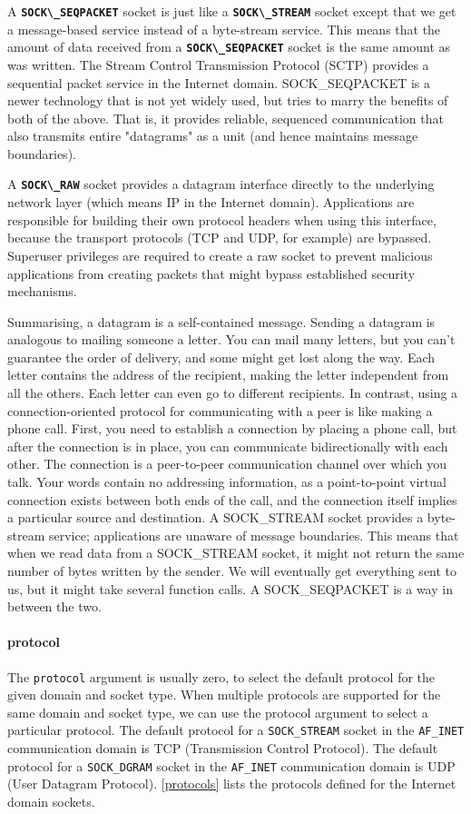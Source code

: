 \documentclass[12pt, letterpaper]{article}
\theoremstyle{definition}
\let\tb\textbf
\let\cd\lstinline
\begin{document}
A \tb{\cd+SOCK\_SEQPACKET+} socket is just like a \tb{\cd+SOCK\_STREAM+} socket except that we get a message-based service instead of a byte-stream service. This means that the amount of data received from a \tb{\cd+SOCK\_SEQPACKET+} socket is the same amount as was written. The Stream Control Transmission Protocol (SCTP) provides a sequential packet service in the Internet domain.  
SOCK\_SEQPACKET is a newer technology that is not yet widely used, but tries to marry the benefits of both of the above. That is, it provides reliable, sequenced communication that also transmits entire "datagrams" as a unit (and hence maintains message boundaries).

A \tb{\cd+SOCK\_RAW+} socket provides a datagram interface directly to the underlying network layer (which means IP in the Internet domain). Applications are responsible for building their own protocol headers when using this interface, because the transport protocols (TCP and UDP, for example) are bypassed. Superuser privileges are required to create a raw socket to prevent malicious applications from creating packets that might bypass established security mechanisms.

Summarising, a datagram is a self-contained message. Sending a datagram is analogous to mailing someone a letter. You can mail many letters, but you can't guarantee the order of delivery, and some might get lost along the way. Each letter contains the address of the recipient, making the letter independent from all the others. Each letter can even go to different recipients.
In contrast, using a connection-oriented protocol for communicating with a peer is like making a phone call. First, you need to establish a connection by placing a phone call, but after the connection is in place, you can communicate bidirectionally with each other. The connection is a peer-to-peer communication channel over which you talk. Your words contain no addressing information, as a point-to-point virtual connection exists between both ends of the call, and the connection itself implies a particular source and destination.
A SOCK\_STREAM socket provides a byte-stream service; applications are unaware of message boundaries. This means that when we read data from a SOCK\_STREAM socket, it might not return the same number of bytes written by the sender. We will eventually get everything sent to us, but it might take several function calls. 
A SOCK\_SEQPACKET is a way in between the two.

\paragraph{\tb{protocol}} The \cd+protocol+ argument is usually zero, to select the default protocol for the given domain and socket type. When multiple protocols are supported for the same domain and socket type, we can use the protocol argument to select a particular protocol. The default protocol for a \cd+SOCK_STREAM+ socket in the \cd+AF_INET+ communication domain is TCP (Transmission Control Protocol). The default protocol for a \cd+SOCK_DGRAM+ socket in the \cd+AF_INET+ communication domain is UDP (User Datagram Protocol). \autoref{protocols} lists the protocols defined for the Internet domain sockets.
\end{document}
